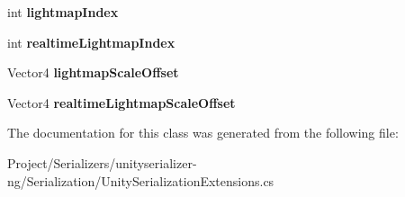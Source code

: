\begin{DoxyCompactItemize}
\mbox{\label{class_serialize_renderer_1_1_stored_information_a7a1e832a0582b3cf779faafbe556cd6b}} 
int {\bfseries lightmap\+Index}
\item 
\mbox{\label{class_serialize_renderer_1_1_stored_information_ab5b05399f0d593b75d830b5a41a8059c}} 
int {\bfseries realtime\+Lightmap\+Index}
\item 
\mbox{\label{class_serialize_renderer_1_1_stored_information_a32b3a6bfb28919610aa4ff164cef6aeb}} 
Vector4 {\bfseries lightmap\+Scale\+Offset}
\item 
\mbox{\label{class_serialize_renderer_1_1_stored_information_af49a12c36efc4ce35abe00a5f4d9de23}} 
Vector4 {\bfseries realtime\+Lightmap\+Scale\+Offset}
\end{DoxyCompactItemize}


The documentation for this class was generated from the following file\+:\begin{DoxyCompactItemize}
\item 
Project/\+Serializers/unityserializer-\/ng/\+Serialization/Unity\+Serialization\+Extensions.\+cs\end{DoxyCompactItemize}
